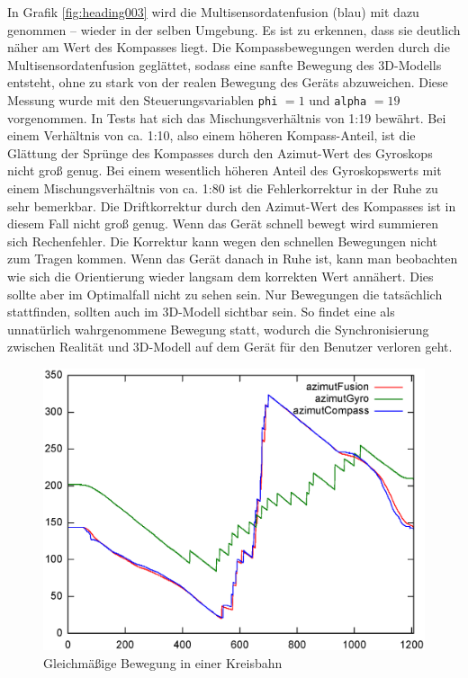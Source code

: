 In Grafik \ref{fig:heading003} wird die Multisensordatenfusion (blau) mit dazu genommen – wieder in der selben Umgebung. Es ist zu erkennen, dass sie deutlich näher am Wert des Kompasses liegt. Die Kompassbewegungen werden durch die Multisensordatenfusion geglättet, sodass eine sanfte Bewegung des 3D-Modells entsteht, ohne zu stark von der realen Bewegung des Geräts abzuweichen. Diese Messung wurde mit den Steuerungsvariablen \texttt{phi} $=1$ und \texttt{alpha} $=19$ vorgenommen. In Tests hat sich das Mischungsverhältnis von 1:19 bewährt. Bei einem Verhältnis von ca. 1:10, also einem höheren Kompass-Anteil, ist die Glättung der Sprünge des Kompasses durch den Azimut-Wert des Gyroskops nicht groß genug. Bei einem wesentlich höheren Anteil des Gyroskopswerts mit einem Mischungsverhältnis von ca. 1:80 ist die Fehlerkorrektur in der Ruhe zu sehr bemerkbar. Die Driftkorrektur durch den Azimut-Wert des Kompasses ist in diesem Fall nicht groß genug. Wenn das Gerät schnell bewegt wird summieren sich Rechenfehler. Die Korrektur kann wegen den schnellen Bewegungen nicht zum Tragen kommen. Wenn das Gerät danach in Ruhe ist, kann man beobachten wie sich die Orientierung wieder langsam dem korrekten Wert annähert. Dies sollte aber im Optimalfall nicht zu sehen sein. Nur Bewegungen die tatsächlich stattfinden, sollten auch im 3D-Modell sichtbar sein. So findet eine als unnatürlich wahrgenommene Bewegung statt, wodurch die Synchronisierung zwischen Realität und 3D-Modell auf dem Gerät für den Benutzer verloren geht.

\begin{figure}[htb]
\centering
\includegraphics[width=\textwidth]{figures/heading005}
\caption{Gleichmäßige Bewegung in einer Kreisbahn}
\label{fig:heading005}
\end{figure}

